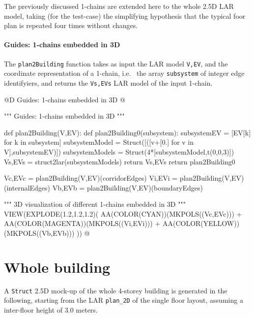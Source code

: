 \documentclass[11pt,oneside]{article}    %
\begin{document}
The previously discussed 1-chains are extended here to the whole 2.5D LAR model, taking (for the test-case) the simplifying hypothesis that the typical foor plan is repeated four times without changes.

\paragraph{Guides: 1-chains embedded in 3D}

The \texttt{plan2Building} function takes as input the LAR model \texttt{V,EV}, and the coordinate representation of a 1-chain, i.e.~ the array \texttt{subsystem} of integer edge identifyiers, and returns the \texttt{Vs,EVs} LAR model of the input 1-chain.

@D Guides: 1-chains embedded in 3D
@{""" Guides: 1-chains embedded in 3D """

def plan2Building(V,EV):
    def plan2Building0(subsystem):
        subsystemEV = [EV[k] for k in subsystem]
        subsystemModel = Struct([([v+[0.] for v in V],subsystemEV)])
        subsystemModels = Struct(4*[subsystemModel,t(0,0,3)])
        Vs,EVs = struct2lar(subsystemModels)
        return Vs,EVs
    return plan2Building0

Vc,EVc = plan2Building(V,EV)(corridorEdges)
Vi,EVi = plan2Building(V,EV)(internalEdges)
Vb,EVb = plan2Building(V,EV)(boundaryEdges)

""" 3D visualization of different 1-chains embedded in 3D """
VIEW(EXPLODE(1.2,1.2,1.2)(
    AA(COLOR(CYAN))(MKPOLS((Vc,EVc))) + AA(COLOR(MAGENTA))(MKPOLS((Vi,EVi))) +
    AA(COLOR(YELLOW))(MKPOLS((Vb,EVb))) ))
@}

\section{Whole building}

A \texttt{Struct} 2.5D mock-up of the whole 4-storey building is generated in the following, starting from the LAR \texttt{plan\_2D} of the single floor layout, assuming a inter-floor height of 3.0 meters. 



\end{document}
